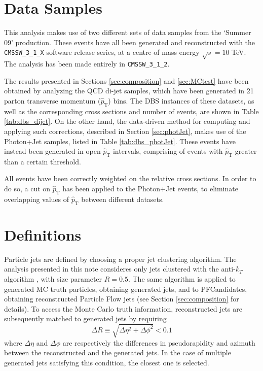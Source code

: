 \documentclass{cmspaper}
\begin{document}
\section{Data Samples}

This analysis makes use of two different sets of data samples from the `Summer 09' production. These events have all been generated and reconstructed with the {\tt CMSSW\_3\_1\_X} software release series, at a centre of mass energy $\sqrt{s} = 10$ TeV. The analysis has been made entirely in {\tt CMSSW\_3\_1\_2}.

The results presented in Sections \ref{sec:composition} and \ref{sec:MCtest} have been obtained by analyzing the  QCD di-jet samples, which have been generated in 21 parton transverse momentum ($\hat{p}_{\mathrm{T}}$) bins. The DBS instances of these datasets, as well as the corresponding cross sections and number of events, are shown in Table \ref{tab:dbs_dijet}. On the other hand, the data-driven method for computing and applying such corrections, described in Section \ref{sec:photJet}, makes use of the Photon+Jet samples, listed in Table \ref{tab:dbs_photJet}. These events have instead been generated in open $\hat{p}_{\mathrm{T}}$ intervals, comprising of events with $\hat{p}_{\mathrm{T}}$ greater than a certain threshold.

All events have been correctly weighted on the relative cross sections. In order to do so, a cut on $\hat{p}_{\mathrm{T}}$ has been applied to the Photon+Jet events, to eliminate overlapping values of $\hat{p}_{\mathrm{T}}$ between different datasets.


\section{Definitions}

Particle jets are defined by choosing a proper jet clustering algorithm. The analysis presented in this note consideres only jets clustered with the anti-$k_{T}$ algorithm \cite{antikt}, with size parameter $R = 0.5$. The same algorithm is applied to generated MC truth particles, obtaining generated jets, and to PFCandidates, obtaining reconstructed Particle Flow jets (see Section \ref{sec:composition} for details). To access the Monte Carlo truth information, reconstructed jets are subsequently matched to generated jets by requiring
$$
\Delta R \equiv \sqrt{ \Delta \eta^2 + \Delta \phi^2} < 0.1
$$
where $\Delta \eta$ and $\Delta \phi$ are respectively the differences in pseudorapidity and azimuth between the reconstructed and the generated jets. In the case of multiple generated jets satisfying this condition, the closest one is selected.
\end{document}
